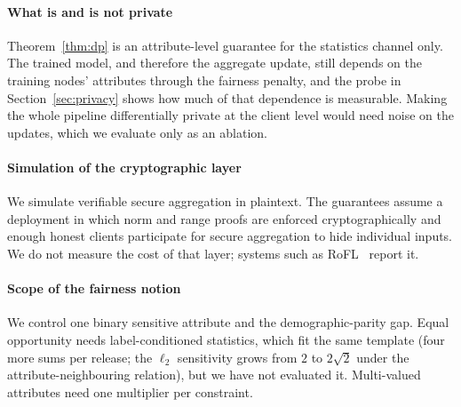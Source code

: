 \paragraph{What is and is not private}
Theorem~\ref{thm:dp} is an attribute-level guarantee for the statistics channel only. The trained model, and therefore the aggregate update, still depends on the training nodes' attributes through the fairness penalty, and the probe in Section~\ref{sec:privacy} shows how much of that dependence is measurable. Making the whole pipeline differentially private at the client level would need noise on the updates, which we evaluate only as an ablation.

\paragraph{Simulation of the cryptographic layer}
We simulate verifiable secure aggregation in plaintext. The guarantees assume a deployment in which norm and range proofs are enforced cryptographically and enough honest clients participate for secure aggregation to hide individual inputs. We do not measure the cost of that layer; systems such as RoFL~\citep{lycklama2023rofl} report it.

\paragraph{Scope of the fairness notion}
We control one binary sensitive attribute and the demographic-parity gap. Equal opportunity needs label-conditioned statistics, which fit the same template (four more sums per release; the $\ell_2$ sensitivity grows from $2$ to $2\sqrt{2}$ under the attribute-neighbouring relation), but we have not evaluated it. Multi-valued attributes need one multiplier per constraint.

